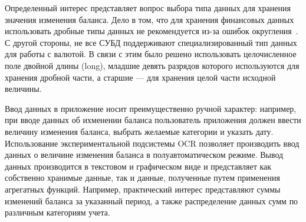 Определенный интерес представляет вопрос выбора типа данных для хранения
значения изменения баланса. Дело в том, что для хранения финансовых данных
использовать дробные типы данных не рекомендуется
из-за ошибок округления~\cite{bloch08}. С другой стороны, не все СУБД
поддерживают специализированный тип данных для работы с валютой.
В связи с этим было решено использовать целочисленное
поле двойной длины (long), младшие девять разрядов которого используются
для хранения дробной части, а старшие --- для хранения целой части
исходной величины.

Ввод данных в приложение носит преимущественно ручной характер:
например, при вводе данных об ихменении баланса
пользователь приложения должен ввести величину изменения баланса,
выбрать желаемые категории и указать дату.
Использование экспериментальной подсистемы OCR позволяет производить
ввод данных о величине изменения баланса в полуавтоматическом режиме.
Вывод данных производится в текстовом и графическом виде и
представляет как собственно хранимые данные, так и данные, полученные путем
применения агрегатных функций. Например, практический интерес представляют
суммы изменений баланса за указанный период, а также распределение
данных сумм по различным категориям учета.








